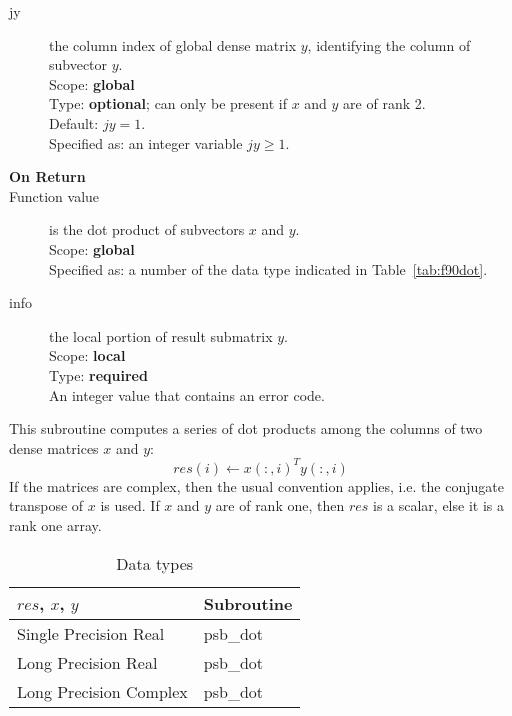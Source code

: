 \begin{description}
\item[jy]  the column index of global dense matrix $y$,
identifying the column of subvector $y$.\\
Scope: {\bf global} \\
Type: {\bf optional}; can only be present if $x$ and $y$ are of rank 2.\\
Default: $jy = 1$.\\
Specified as: an integer variable $jy\ge 1$. 
\item[\bf On Return] 
\item[Function value] is the dot product of subvectors $x$ and $y$.\\
Scope: {\bf global} \\
Specified as: a number of the data type indicated in Table~\ref{tab:f90dot}.
\item[info] the local portion of result submatrix $y$.\\
Scope: {\bf local} \\
Type: {\bf required} \\
An integer value that contains an error code. 
\end{description}
%
%


This subroutine computes a series of  dot products among the columns of
two dense matrices  $x$ and $y$: 
\[ res(i) \leftarrow x(:,i)^T y(:,i)\]
If the matrices are complex, then the
usual convention applies, i.e. the conjugate transpose of $x$ is
used. If $x$ and $y$ are of rank one, then $res$ is a scalar, else it
is a rank one array. 

\begin{table}[h]
\begin{center}
\begin{tabular}{ll}
\hline
$res$, $x$, $y$ & {\bf Subroutine}\\
\hline
Single Precision Real & psb\_dot\\
Long Precision Real & psb\_dot \\
Long Precision Complex & psb\_dot \\	
\hline
\end{tabular}
\end{center}
\caption{Data types\label{tab:f90mdot}}
\end{table}

